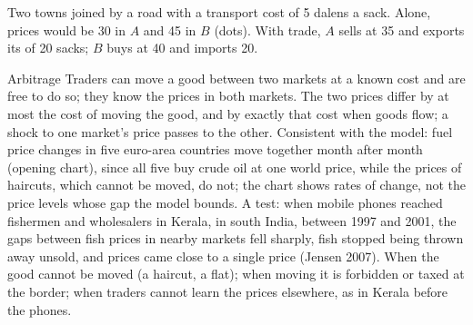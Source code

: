 \begin{omfigure}

{\small Two towns joined by a road with a transport cost of 5 dalens a sack. Alone, prices would be 30 in $A$ and 45 in $B$ (dots). With trade, $A$ sells
at 35 and exports its  of 20 sacks; $B$ buys at 40 and imports 20.}
\end{omfigure}

\begin{model}{Arbitrage}
\assumes Traders can move a good between two markets at a known cost and are free to do so; they know the prices in both markets.
\predicts The two prices differ by at most the cost of moving the good, and by exactly that cost when goods flow; a shock to one market's price passes to
  the other.
\tested Consistent with the model: fuel price changes in five euro-area countries move together month after month (opening chart), since all five
  buy crude oil at one world price, while the prices of haircuts, which cannot be moved, do not; the chart shows rates of change, not the price levels
  whose gap the model bounds. A test: when mobile phones reached fishermen and wholesalers in Kerala, in south India, between 1997 and 2001, the gaps between fish prices in nearby
  markets fell sharply, fish stopped being thrown away unsold, and prices came close to a single price (Jensen 2007).
\breaks When the good cannot be moved (a haircut, a flat); when moving it is forbidden or taxed at the border; when traders cannot learn the prices elsewhere,
  as in Kerala before the phones.
\end{model}

